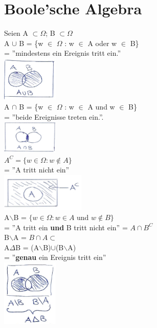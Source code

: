 \section{Boole'sche Algebra}
Seien A $\subset \Omega$; B $\subset \Omega$\\
A $\cup$ B = \{w $\in$ $\Omega$ : w $\in$ A oder w $\in$ B\}\\
= ''mindestens ein Ereignis tritt ein.''\\\includegraphics[width=0.2\textwidth]{img/ver.PNG}\medskip\\
A $\cap$ B = \{w $\in$ $\Omega$ : w $\in$ A und w $\in$ B\}\\
= ''beide Ereignisse treten ein.''.\\\includegraphics[width=0.2\textwidth]{img/schnitt.PNG}\medskip\\
$A^C =\{ w \in \Omega : w \notin A\}$\\
= ''A tritt nicht ein''\\\includegraphics[width=0.3\textwidth]{img/komplement.PNG}\medskip\\
A$\backslash$B = $\{w \in \Omega : w \in A $ und $w \notin B\}$\\
= ''A tritt ein \textbf{und} B tritt nicht ein'' = $A\cap B^C$\medskip\\
B$\backslash$A = $B\cap A \subset$\\
A$\Delta$B = (A$\backslash$B)$\cup$(B$\backslash$A)\\
= ''\textbf{genau} ein Ereignis tritt ein''\\\includegraphics[width=0.2\textwidth]{img/genau1.PNG}\medskip\\
